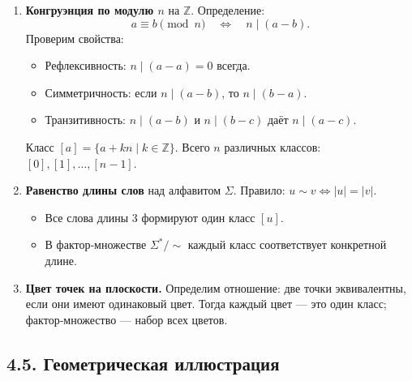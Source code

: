 \documentclass{article}
\begin{document}
\begin{enumerate}[label=\arabic*)]
  \item \textbf{Конгруэнция по модулю $n$} на $\mathbb{Z}$.  
    Определение: 
    \[
      a \equiv b \pmod{n}
      \quad\Longleftrightarrow\quad
      n \mid (a-b).
    \]
    Проверим свойства:
    \begin{itemize}[leftmargin=*]
      \item Рефлексивность: $n\mid(a-a)=0$ всегда.
      \item Симметричность: если $n\mid(a-b)$, то $n\mid(b-a)$.
      \item Транзитивность: $n\mid(a-b)$ и $n\mid(b-c)$ даёт $n\mid(a-c)$.
    \end{itemize}
    Класс $[a]=\{a+kn \mid k\in\mathbb{Z}\}$.  
    Всего $n$ различных классов: $[0], [1],\dots,[n-1]$.

  \item \textbf{Равенство длины слов} над алфавитом $\Sigma$.  
    Правило: $u\sim v \iff |u|=|v|$.  
    \begin{itemize}[leftmargin=*]
      \item Все слова длины 3 формируют один класс $[u]$.
      \item В фактор‑множестве $\Sigma^*/{\sim}$ каждый класс соответствует конкретной длине.
    \end{itemize}

  \item \textbf{Цвет точек на плоскости.}  
    Определим отношение: две точки эквивалентны, если они имеют одинаковый цвет.  
    Тогда каждый цвет — это один класс; фактор‑множество — набор всех цветов.
\end{enumerate}

\subsection*{4.5. Геометрическая иллюстрация}

\begin{center}
\end{center}
\end{document}
